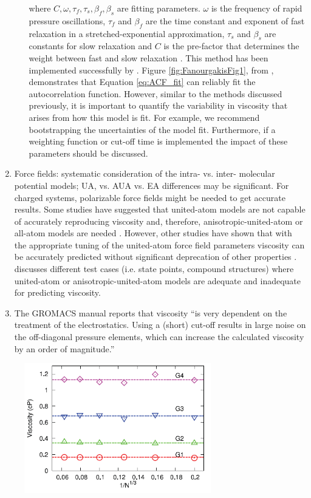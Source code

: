 \documentclass[9pt]{livecoms}
\begin{document}
\begin{enumerate}
\begin{enumerate}
\begin{equation}
		\end{equation}
		where $C, \omega, \tau_f, \tau_s, \beta_f, \beta_s$ are fitting parameters. $\omega$ is the frequency of rapid pressure oscillations, $\tau_f$ and $\beta_f$ are the time constant and exponent of fast relaxation in a stretched-exponential approximation, $\tau_s$ and $\beta_s$ are constants for slow relaxation and $C$ is the pre-factor that determines the weight between fast and slow relaxation \cite{GROMACS}. This method has been implemented successfully by \cite{Fanourgakis2012}. Figure \ref{fig:FanourgakisFig1}, from \cite{Fanourgakis2012}, demonstrates that Equation \ref{eq:ACF_fit} can reliably fit the autocorrelation function. However, similar to the methods discussed previously, it is important to quantify the variability in viscosity that arises from how this model is fit. For example, we recommend bootstrapping the uncertainties of the model fit. Furthermore, if a weighting function or cut-off time is implemented the impact of these parameters should be discussed. 
	\end{enumerate}   
	\item Force fields: systematic consideration of the intra- vs. inter- molecular potential models; UA, vs. AUA vs. EA differences may be significant. For charged systems, polarizable force fields might be needed to get accurate results. Some studies have suggested that united-atom models are not capable of accurately reproducing viscosity and, therefore, anisotropic-united-atom or all-atom models are needed \cite{Allen1987,Payal2012,Mondello1997}. However, other studies have shown that with the appropriate tuning of the united-atom force field parameters viscosity can be accurately predicted without significant deprecation of other properties \cite{Gordon2006}. \cite{Ungerer2007} discusses different test cases (i.e. state points, compound structures) where united-atom or anisotropic-united-atom models are adequate and inadequate for predicting viscosity.
	\item The GROMACS manual reports that viscosity ``is very dependent on the treatment of the electrostatics. Using a (short) cut-off results in large noise on the off-diagonal pressure elements, which can increase the calculated viscosity by an order of magnitude.''
	
\end{enumerate}


\begin{figure}[htb!]
	\centering
	\includegraphics[width=3.2in]{figures/MoultosFig3.png}
	\caption{}
	\label{fig:MoultosFig3}
\end{figure}
\end{document}
